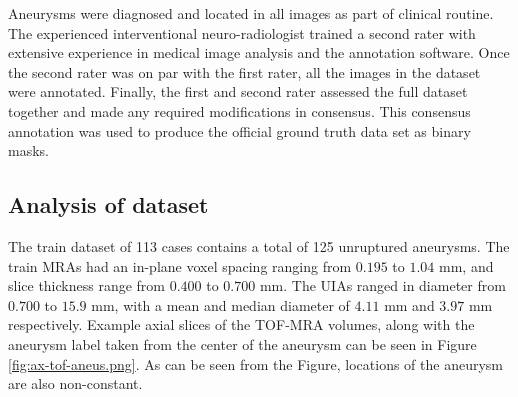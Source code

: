 Aneurysms were diagnosed and located in all images as part of clinical routine. The experienced interventional neuro-radiologist trained a second rater with extensive experience in medical image analysis and the annotation software. Once the second rater was on par with the first rater, all the images in the dataset were annotated. Finally, the first and second rater assessed the full dataset together and made any required modifications in consensus. This consensus annotation was used to produce the official ground truth data set as binary masks.

\subsection{Analysis of dataset}
The train dataset of 113 cases contains a total of 125 unruptured aneurysms. The train MRAs had an in-plane voxel spacing ranging from $0.195$ to $1.04$ mm, and slice thickness range from $0.400$ to $0.700$ mm. The UIAs ranged in diameter from $0.700$ to $15.9$ mm, with a mean and median diameter of $4.11$ mm and $3.97$ mm respectively. Example axial slices of the TOF-MRA volumes, along with the aneurysm label taken from the center of the aneurysm can be seen in Figure \ref{fig:ax-tof-aneus.png}. As can be seen from the Figure, locations of the aneurysm are also non-constant.


